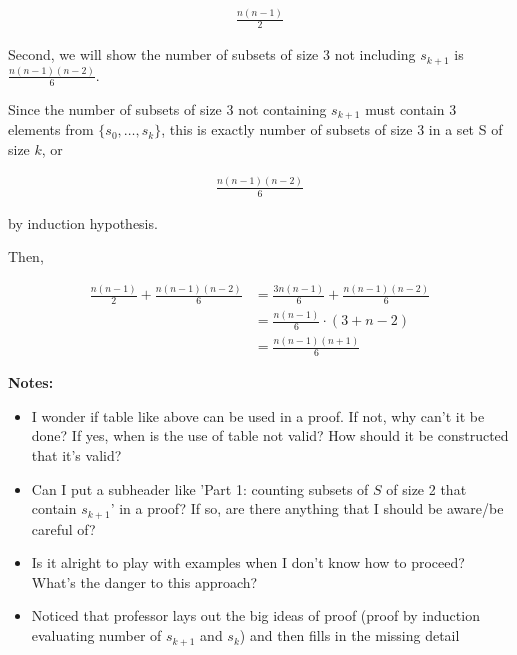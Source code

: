 \documentclass[12pt]{article}
\begin{document}
\begin{itemize}
\begin{mdframed}
        \begin{align}
            \frac{n(n-1)}{2}
        \end{align}

        \bigskip

        Second, we will show the number of subsets of size 3 not including $s_{k+1}$
        is $\frac{n(n-1)(n-2)}{6}$.

        \bigskip

        Since the number of subsets of size 3 not containing $s_{k+1}$ must contain
        3 elements from $\{s_0,\dots,s_k\}$, this is exactly number of subsets of size
        3 in a set S of size $k$, or

        \begin{align}
            \frac{n(n-1)(n-2)}{6}
        \end{align}

        by induction hypothesis.

        \bigskip

        \color{black}

        Then,

        \begin{align}
            \frac{n(n-1)}{2} + \frac{n(n-1)(n-2)}{6} &= \frac{3n(n-1)}{6} + \frac{n(n-1)(n-2)}{6}\\
            &= \frac{n(n-1)}{6} \cdot (3 + n - 2)\\
            &= \frac{n(n-1)(n+1)}{6}
        \end{align}
    \end{mdframed}

    \bigskip

    \textbf{Notes:}
    \begin{itemize}
        \item I wonder if table like above can be used in a proof. If not, why
        can't it be done? If yes, when is the use of table not valid? How should
        it be constructed that it's valid?

        \item Can I put a subheader like 'Part 1: counting subsets of $S$ of size 2
        that contain $s_{k+1}$' in a proof? If so, are there anything that I should be
        aware/be careful of?

        \item Is it alright to play with examples when I don't know how to proceed?
        What's the danger to this approach?

        \item Noticed that professor lays out the big ideas of proof (proof by induction
        evaluating number of $s_{k+1}$ and $s_k$) and then fills in the missing detail
    \end{itemize}

\end{itemize}
\end{document}
